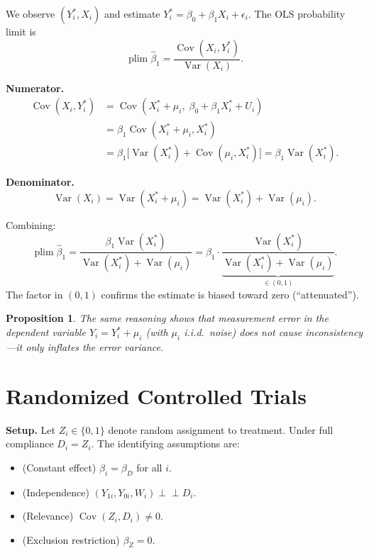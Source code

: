 \documentclass[12pt,a4paper]{article}
\theoremstyle{plain}
\newtheorem{propositio}{Proposition}[section]
\theoremstyle{definition}
\renewenvironment{proof}{\pushQED{\qed}\normalfont}{\popQED\par\nobreak}
\newcommand{\Cov}{\operatorname{Cov}}
\newcommand{\Var}{\operatorname{Var}}
\newcommand{\plim}{\operatorname{plim}}
\newcommand{\ind}{\perp\!\!\!\perp}
\begin{document}
\begin{proof}
We observe $(Y_i^*, X_i)$ and estimate $Y_i^*=\beta_0+\beta_1 X_i + \epsilon_i$.  The OLS probability limit is
\[
  \plim\hat\beta_1 = \frac{\Cov(X_i,Y_i^*)}{\Var(X_i)}.
\]

\textbf{Numerator.}
\begin{align*}
  \Cov(X_i,Y_i^*)
  &= \Cov(X_i^*+\mu_i,\; \beta_0+\beta_1 X_i^*+U_i)\\
  &= \beta_1\Cov(X_i^*+\mu_i,X_i^*)\\
  &= \beta_1\bigl[\Var(X_i^*)+\Cov(\mu_i,X_i^*)\bigr]
   = \beta_1\Var(X_i^*).
\end{align*}

\textbf{Denominator.}
\[
  \Var(X_i) = \Var(X_i^*+\mu_i) = \Var(X_i^*)+\Var(\mu_i).
\]

Combining:
\[
  \plim\hat\beta_1
  = \frac{\beta_1\Var(X_i^*)}{\Var(X_i^*)+\Var(\mu_i)}
  = \beta_1\cdot\underbrace{\frac{\Var(X_i^*)}{\Var(X_i^*)+\Var(\mu_i)}}_{\in(0,1)}.
\]
The factor in $(0,1)$ confirms the estimate is biased toward zero (``attenuated'').
\end{proof}

\begin{propositio}
  The same reasoning shows that measurement error in the \emph{dependent} variable $Y_i=Y_i^*+\mu_i$ (with $\mu_i$ i.i.d.\ noise) does \emph{not} cause inconsistency—it only inflates the error variance.
\end{propositio}

\section{Randomized Controlled Trials}

\noindent\textbf{Setup.}
Let $Z_i\in\{0,1\}$ denote random assignment to treatment.  Under full compliance $D_i=Z_i$.
The identifying assumptions are:
\begin{itemize}[leftmargin=2em]
  \item[A1] (Constant effect) $\beta_i=\beta_D$ for all $i$.
  \item[A2] (Independence) $(Y_{1i},Y_{0i},W_i)\ind D_i$.
  \item[A3] (Relevance) $\Cov(Z_i,D_i)\ne 0$.
  \item[A4] (Exclusion restriction) $\beta_Z=0$.
\end{itemize}
\end{document}
